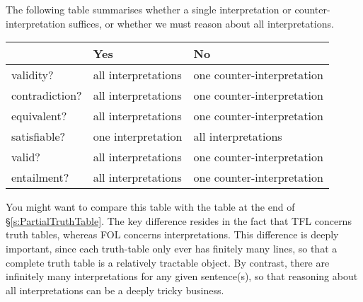 The following table summarises whether a single interpretation or counter-interpretation suffices, or whether we must reason about all interpretations.

\begin{center}\small
\begin{tabular}{l l l}
 & \textbf{Yes} & \textbf{No}\\
 \hline
validity? & all interpretations & one counter-interpretation\\
contradiction? &  all interpretations  & one counter-interpretation\\
equivalent? & all interpretations & one counter-interpretation\\
satisfiable? & one interpretation & all interpretations\\
valid? & all interpretations & one counter-interpretation\\
entailment? & all interpretations & one counter-interpretation\\
\end{tabular}
\end{center}
\label{table.ModelOrArgument}

You might want to compare this table with the table at the end of \S\ref{s:PartialTruthTable}. The key difference resides in the fact that TFL concerns truth tables, whereas FOL concerns interpretations. This difference is deeply important, since each truth-table only ever has finitely many lines, so that a complete truth table is a relatively tractable object. By contrast, there are infinitely many interpretations for any given sentence(s), so that reasoning about all interpretations can be a deeply tricky business. 
